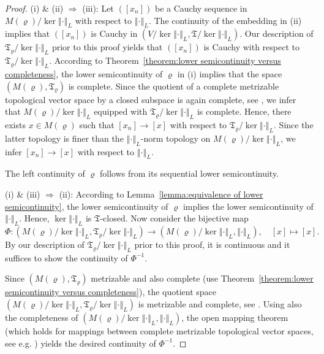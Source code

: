 \documentclass[a4paper,11pt,reqno]{amsart}
\theoremstyle{definition}
\numberwithin{equation}{section}
\newcommand{\vr}{{\varrho}}
\newcommand{\av}[1]{\left\Vert #1\right\Vert}
\newcommand{\1}{\mathds{1}}
\begin{document}
\begin{proof}


 (i) \& (ii) $\Rightarrow$ (iii): Let $([x_n])$ be a Cauchy sequence in $M(\vr)/\ker \av{\cdot}_L$ with respect to $\av{\cdot}_L$. The continuity of the embedding in (ii) implies that $([x_n])$ is Cauchy in $(V/\ker \av{\cdot}_L,\mathfrak{T}/\ker \av{\cdot}_L)$. Our description of $\mathfrak{T}_\vr / \ker \av{\cdot}_L$ prior to this proof yields that $([x_n])$ is Cauchy with respect to $\mathfrak{T}_\vr / \ker \av{\cdot}_L$. According to Theorem~\ref{theorem:lower semicontinuity versus completeness}, the lower semicontinuity of $\vr$ in (i) implies that the space $(M(\vr),\mathfrak{T}_\vr)$ is complete. Since the quotient of a complete metrizable topological vector space by a closed subspace is again complete, see \cite[Theorem~6.3]{Schae71}, we infer that $M(\vr)/\ker \av{\cdot}_L$ equipped with $\mathfrak{T}_\vr / \ker \av{\cdot}_L$ is complete. Hence, there exists $x \in M(\vr)$ such that $[x_n] \to [x]$ with respect to $\mathfrak{T}_\vr / \ker \av{\cdot}_L$. Since the latter topology is finer than the $\av{\cdot}_L$-norm topology on $M(\vr) / \ker \av{\cdot}_L$, we infer $[x_n] \to [x]$ with respect to $\av{\cdot}_L$.  
 
 The left continuity of $\vr$ follows from its sequential lower semicontinuity.
 
 
 (i) \& (iii) $\Rightarrow$ (ii): According to Lemma~\ref{lemma:equivalence of lower semicontinuity}, the lower semicontinuity of $\vr$ implies the lower semicontinuity of $\av{\cdot}_L$. Hence, $\ker \av{\cdot}_L$ is $\mathfrak{T}$-closed. Now consider the bijective map 
 $$\Phi \colon (M(\vr)/\ker \av{\cdot}_L, \mathfrak{T}_\vr / \ker \av{\cdot}_L) \to (M(\vr)/\ker \av{\cdot}_L, \av{\cdot}_L), \quad  [x] \mapsto [x].$$
 By our description of  $\mathfrak{T}_\vr / \ker \av{\cdot}_L$ prior to this proof, it is continuous and it suffices to show the continuity of $\Phi^{-1}$. 
 
 Since $(M(\vr),\mathfrak{T}_\vr)$ metrizable and also complete (use Theorem~\ref{theorem:lower semicontinuity versus completeness}), the quotient space $(M(\vr)/\ker \av{\cdot}_L, \mathfrak{T}_\vr / \ker \av{\cdot}_L)$ is  metrizable and  complete, see \cite[Theorem~6.3]{Schae71}. Using also the completeness of $(M(\vr)/\ker \av{\cdot}_L, \av{\cdot}_L)$, the open mapping theorem (which holds for mappings between complete metrizable topological vector spaces, see e.g. \cite[Theorem~3.8]{Hus65}) yields the desired continuity of $\Phi^{-1}$.
 

\end{proof}
\end{document}
